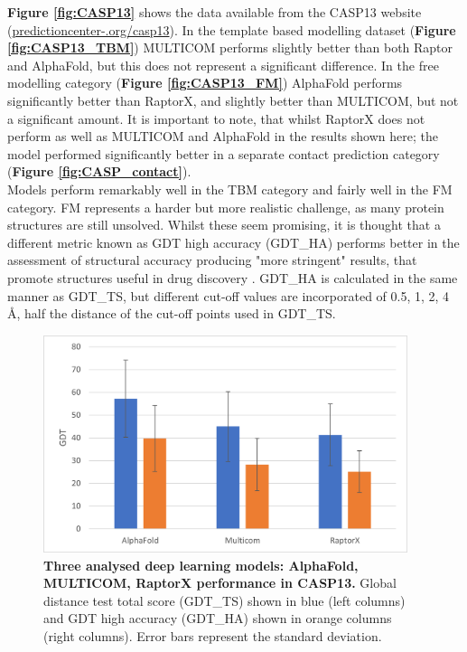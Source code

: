 \textbf{Figure \ref{fig:CASP13}} shows the data available from the CASP13 website (\href{https://predictioncenter.org/casp13/}{predictioncenter-.org/casp13}). In the template based modelling dataset (\textbf{Figure \ref{fig:CASP13_TBM}}) MULTICOM performs slightly better than both Raptor and AlphaFold, but this does not represent a significant difference. In the free modelling category (\textbf{Figure \ref{fig:CASP13_FM}}) AlphaFold performs significantly better than RaptorX, and slightly better than MULTICOM, but not a significant amount. It is important to note, that whilst RaptorX does not perform as well as MULTICOM and AlphaFold in the results shown here; the model performed significantly better in a separate contact prediction category (\textbf{Figure \ref{fig:CASP_contact}}).
\\[12pt]
Models perform remarkably well in the TBM category and fairly well in the FM category. FM represents a harder but more realistic challenge, as many protein structures are still unsolved. Whilst these seem promising, it is thought that a different metric known as GDT high accuracy (GDT\_HA) performs better in the assessment of structural accuracy producing "more stringent" results, that promote structures useful in drug discovery \cite{readAssessmentCASP7Predictions2007}. GDT\_HA is calculated in the same manner as GDT\_TS, but different cut-off values are incorporated of 0.5, 1, 2, 4 Å, half the distance of the cut-off points used in GDT\_TS.
\begin{figure}[H]
    \begin{small}
        \begin{center}
            \includegraphics[width=0.95\textwidth]{images/CASP_HA.png}
        \end{center}
        \caption{\textbf{Three analysed deep learning models: AlphaFold, MULTICOM, RaptorX \cite{seniorImprovedProteinStructure2020, houMULTICOMProteinStructure2020a,xuAnalysisDistancebasedProtein2019} performance in CASP13.} Global distance test total score (GDT\_TS) shown in blue (left columns) and GDT high accuracy (GDT\_HA) shown in orange columns (right columns). Error bars represent the standard deviation. }
        \label{fig:CASP_HA}
    \end{small}
\end{figure}
